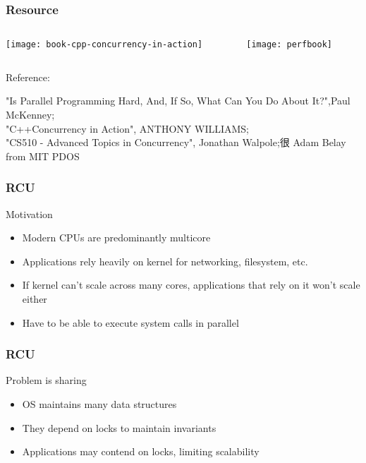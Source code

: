 \begin{frame}
    \frametitle{Resource}
    
    
    

	\begin{columns}
    
    \begin{column}{.5\textwidth}
        \centering
        
        \texttt{[image: book-cpp-concurrency-in-action]}
        
    \end{column}
    
    \begin{column}{.5\textwidth}
        
      \texttt{[image: perfbook]}
       
        
    \end{column}
    
    
\end{columns}
    
    \tiny Reference:
    
    "Is Parallel Programming Hard, And, If So, What Can You Do About It?",Paul McKenney;\\
    "C++Concurrency in Action", ANTHONY WILLIAMS; \\
    "CS510 - Advanced Topics in Concurrency", Jonathan Walpole;很 
    Adam Belay from MIT PDOS
    
\end{frame}

\begin{frame}[fragile]
    \frametitle{RCU}
    \Large
    Motivation
    \begin{itemize}
    \item Modern CPUs are predominantly multicore
    \item Applications rely heavily on kernel for networking,
    filesystem, etc.
    \item If kernel can’t scale across many cores, applications
    that rely on it won’t scale either
    \item Have to be able to execute system calls in parallel
\end{itemize}
\end{frame}
\begin{frame}[fragile]
    \frametitle{RCU}
    \Large
    Problem is sharing
    \begin{itemize}
        \item OS maintains many data structures
        \item They depend on locks to maintain invariants
        \item Applications may contend on locks, limiting
        scalability
        
    \end{itemize}
    
\end{frame}

